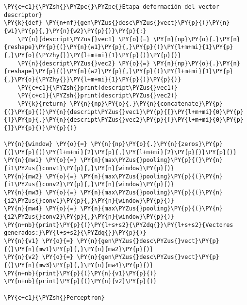 \begin{tcolorbox}[breakable, size=fbox, boxrule=1pt, pad at break*=1mm,colback=cellbackground, colframe=cellborder]
\begin{Verbatim}[commandchars=\\\{\}]
\PY{c+c1}{\PYZsh{}\PYZpc{}\PYZpc{}Etapa deformación del vector descriptor}
\PY{k}{def} \PY{n+nf}{gen\PYZus{}desc\PYZus{}vect}\PY{p}{(}\PY{n}{w1}\PY{p}{,}\PY{n}{w2}\PY{p}{)}\PY{p}{:}
    \PY{n}{descript\PYZus{}vec1} \PY{o}{=} \PY{n}{np}\PY{o}{.}\PY{n}{reshape}\PY{p}{(}\PY{n}{w1}\PY{p}{,}\PY{p}{(}\PY{l+m+mi}{1}\PY{p}{,}\PY{o}{\PYZhy{}}\PY{l+m+mi}{1}\PY{p}{)}\PY{p}{)}
    \PY{n}{descript\PYZus{}vec2} \PY{o}{=} \PY{n}{np}\PY{o}{.}\PY{n}{reshape}\PY{p}{(}\PY{n}{w2}\PY{p}{,}\PY{p}{(}\PY{l+m+mi}{1}\PY{p}{,}\PY{o}{\PYZhy{}}\PY{l+m+mi}{1}\PY{p}{)}\PY{p}{)}
    \PY{c+c1}{\PYZsh{}print(descript\PYZus{}vec1)}
    \PY{c+c1}{\PYZsh{}print(descript\PYZus{}vec2)}
    \PY{k}{return} \PY{n}{np}\PY{o}{.}\PY{n}{concatenate}\PY{p}{(}\PY{p}{(}\PY{n}{descript\PYZus{}vec1}\PY{p}{[}\PY{l+m+mi}{0}\PY{p}{]}\PY{p}{,}\PY{n}{descript\PYZus{}vec2}\PY{p}{[}\PY{l+m+mi}{0}\PY{p}{]}\PY{p}{)}\PY{p}{)}

\PY{n}{window} \PY{o}{=} \PY{n}{np}\PY{o}{.}\PY{n}{zeros}\PY{p}{(}\PY{p}{(}\PY{l+m+mi}{2}\PY{p}{,}\PY{l+m+mi}{2}\PY{p}{)}\PY{p}{)}
\PY{n}{mw1} \PY{o}{=} \PY{n}{max\PYZus{}pooling}\PY{p}{(}\PY{n}{i1\PYZus{}conv1}\PY{p}{,}\PY{n}{window}\PY{p}{)}
\PY{n}{mw2} \PY{o}{=} \PY{n}{max\PYZus{}pooling}\PY{p}{(}\PY{n}{i1\PYZus{}conv2}\PY{p}{,}\PY{n}{window}\PY{p}{)}
\PY{n}{mw3} \PY{o}{=} \PY{n}{max\PYZus{}pooling}\PY{p}{(}\PY{n}{i2\PYZus{}conv1}\PY{p}{,}\PY{n}{window}\PY{p}{)}
\PY{n}{mw4} \PY{o}{=} \PY{n}{max\PYZus{}pooling}\PY{p}{(}\PY{n}{i2\PYZus{}conv2}\PY{p}{,}\PY{n}{window}\PY{p}{)}
\PY{n+nb}{print}\PY{p}{(}\PY{l+s+s2}{\PYZdq{}}\PY{l+s+s2}{Vectores generados:}\PY{l+s+s2}{\PYZdq{}}\PY{p}{)}
\PY{n}{v1} \PY{o}{=} \PY{n}{gen\PYZus{}desc\PYZus{}vect}\PY{p}{(}\PY{n}{mw1}\PY{p}{,}\PY{n}{mw2}\PY{p}{)}
\PY{n}{v2} \PY{o}{=} \PY{n}{gen\PYZus{}desc\PYZus{}vect}\PY{p}{(}\PY{n}{mw3}\PY{p}{,}\PY{n}{mw4}\PY{p}{)}
\PY{n+nb}{print}\PY{p}{(}\PY{n}{v1}\PY{p}{)}
\PY{n+nb}{print}\PY{p}{(}\PY{n}{v2}\PY{p}{)}

\PY{c+c1}{\PYZsh{}Perceptron}


\end{Verbatim}
\end{tcolorbox}
